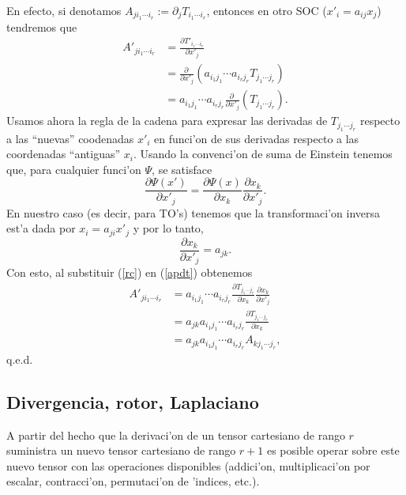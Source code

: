 En efecto, si denotamos $A_{ji_1\cdots i_r}:=\partial_jT_{i_1\cdots i_r}$, entonces en otro SOC ($x'_i=a_{ij}x_j$) tendremos que
\begin{align}
A'_{ji_1\cdots i_r} &= \frac{\partial T'_{i_1\cdots i_r}}{\partial x'_j} \\
&= \frac{\partial\ }{\partial x'_j}\left(a_{i_1j_1}\cdots a_{i_rj_r}T_{j_1\cdots j_r}\right) \\
&= a_{i_1j_1}\cdots a_{i_rj_r}\frac{\partial\ }{\partial x'_j}\left(T_{j_1\cdots j_r}\right) . \label{apdt}
\end{align}
Usamos ahora la regla de la cadena para expresar las derivadas de $T_{j_1\cdots j_r}$ respecto a las ``nuevas'' coodenadas $x'_i$ en funci'on de sus derivadas respecto a las coordenadas ``antiguas'' $x_i$. Usando la convenci'on de suma de Einstein tenemos que, para cualquier funci'on $\Psi$, se satisface
\begin{equation}\label{rc}
\frac{\partial\Psi(x')}{\partial x'_j}=\frac{\partial\Psi(x)}{\partial x_k}\frac{\partial x_k}{\partial x'_j}.
\end{equation}
En nuestro caso (es decir, para TO's) tenemos que la transformaci'on inversa est'a dada por $x_i=a_{ji}x'_j$ y por lo tanto, 
\begin{equation}
\frac{\partial x_k}{\partial x'_j}=a_{jk}.
\end{equation}
Con esto, al substituir (\ref{rc}) en (\ref{apdt}) obtenemos
\begin{align}
A'_{ji_1\cdots i_r} &= a_{i_1j_1}\cdots a_{i_rj_r} \frac{\partial T_{j_1\cdots j_r}}{\partial x_k}\frac{\partial x_k}{\partial x'_j}  \\
&= a_{jk}a_{i_1j_1}\cdots a_{i_rj_r} \frac{\partial T_{j_1\cdots j_r}}{\partial x_k} \\
&= a_{jk}a_{i_1j_1}\cdots a_{i_rj_r} A_{kj_1\cdots j_r},
\end{align}
q.e.d.

\subsection{Divergencia, rotor, Laplaciano}
A partir del hecho que la derivaci'on de un tensor cartesiano de rango $r$ suministra un nuevo tensor cartesiano de rango $r+1$ es posible operar sobre este nuevo tensor con las operaciones disponibles (addici'on, multiplicaci'on por escalar, contracci'on, permutaci'on de 'indices, etc.). 

